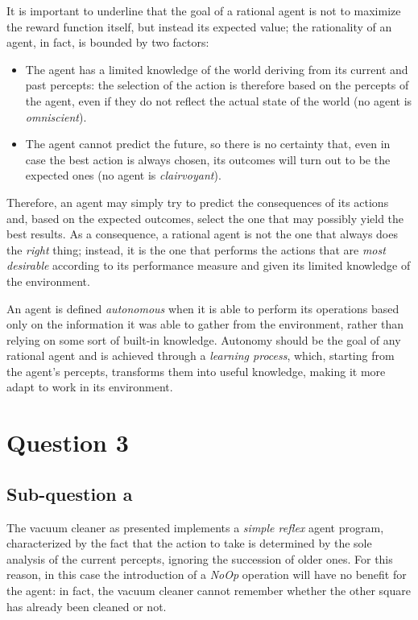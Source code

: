 \documentclass[letterpaper,headings=standardclasses]{scrartcl}
\begin{document}
It is important to underline that the goal of a rational agent is not to maximize the reward function itself, but instead its expected value; the rationality of an agent, in fact, is bounded by two factors:

\begin{itemize}

\item The agent has a limited knowledge of the world deriving from its current and past percepts: the selection of the action is therefore based on the percepts of the agent, even if they do not reflect the actual state of the world (no agent is \emph{omniscient}).

\item The agent cannot predict the future, so there is no certainty that, even in case the best action is always chosen, its outcomes will turn out to be the expected ones (no agent is \emph{clairvoyant}). 
 
\end{itemize}

Therefore, an agent may simply try to predict the consequences of its actions and, based on the expected outcomes, select the one that may possibly yield the best results. As a consequence, a rational agent is not the one that always does the \emph{right} thing; instead, it is the one that performs the actions that are \emph{most desirable} according to its performance measure and given its limited knowledge of the environment.

An agent is defined \emph{autonomous} when it is able to perform its operations based only on the information it was able to gather from the environment, rather than relying on some sort of built-in knowledge. Autonomy should be the goal of any rational agent and is achieved through a \emph{learning process}, which, starting from the agent's percepts, transforms them into useful knowledge, making it more adapt to work in its environment.

\section{Question 3}

\subsection{Sub-question a}

The vacuum cleaner as presented implements a \emph{simple reflex} agent program, characterized by the fact that the action to take is determined by the sole analysis of the current percepts, ignoring the succession of older ones. For this reason, in this case the introduction of a \emph{NoOp} operation will have no benefit for the agent: in fact, the vacuum cleaner cannot remember whether the other square has already been cleaned or not.
\end{document}

